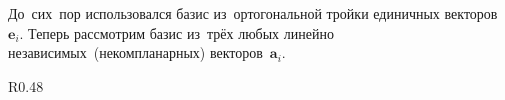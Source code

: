 \newpage



\begin{otherlanguage}{russian}

До~сих~пор использовался базис из~ортогональной тройки единичных векторов~${\bm{e}_i}$.
Теперь рассмотрим базис из~трёх любых линейно независимых~(некомпланарных) векторов~${\bm{a}_i}$.

\begin{wrapfigure}[20]{R}{0.48\textwidth}
\end{wrapfigure}
\end{otherlanguage}
